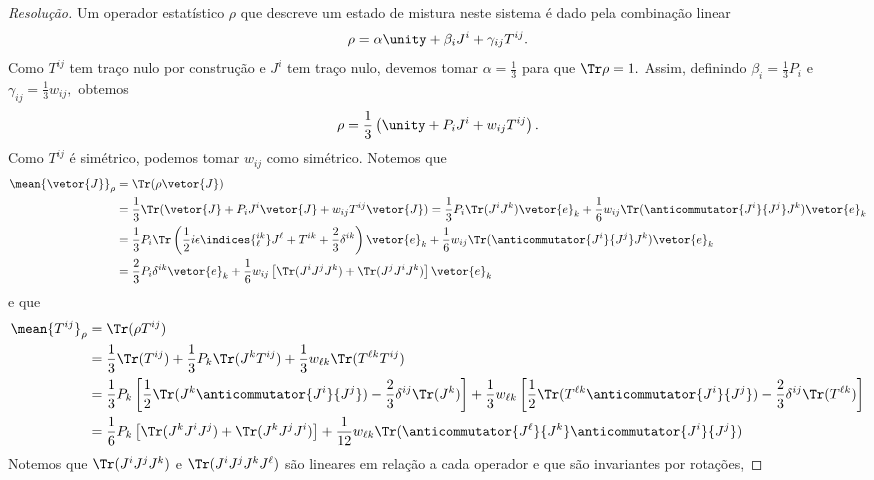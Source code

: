 \begin{proof}[Resolução]
    Um operador estatístico \(\rho\) que descreve um estado de mistura neste sistema é dado pela combinação linear
    \begin{equation*}
        \rho = \alpha\unity + \beta_i J^i + \gamma_{ij} T^{ij}.
    \end{equation*}
    Como \(T^{ij}\) tem traço nulo por construção e \(J^i\) tem traço nulo, devemos tomar \(\alpha = \frac13\) para que \(\Tr\rho = 1.\) Assim, definindo \(\beta_i = \frac13 P_i\) e \(\gamma_{ij} = \frac13 w_{ij},\) obtemos
    \begin{equation*}
        \rho = \frac13 \left(\unity + P_i J^i + w_{ij} T^{ij}\right).
    \end{equation*}
    Como \(T^{ij}\) é simétrico, podemos tomar \(w_{ij}\) como simétrico. Notemos que
    \begin{align*}
        \mean{\vetor{J}}_\rho &= \Tr( \rho \vetor{J})\\
                              &= \frac13 \Tr(\vetor{J} + P_i J^i \vetor{J} + w_{ij} T^{ij} \vetor{J}) = \frac13 P_i \Tr(J^i J^k) \vetor{e}_k + \frac16 w_{ij} \Tr(\anticommutator{J^i}{J^j}J^k) \vetor{e}_k\\
                              &= \frac13 P_i \Tr\left(\frac12i\epsilon\indices{^{ik}_\ell}J^\ell + T^{ik} + \frac23 \delta^{ik}\right)\vetor{e}_k + \frac16 w_{ij} \Tr(\anticommutator{J^i}{J^j}J^k)\vetor{e}_k\\
                              &= \frac23 P_i \delta^{ik} \vetor{e}_k + \frac16 w_{ij} \left[\Tr(J^i J^j J^k) + \Tr(J^j J^i J^k)\right] \vetor{e}_k
    \end{align*}
    e que
    \begin{align*}
        \mean{T^{ij}}_{\rho} &= \Tr(\rho T^{ij})\\
                             &= \frac13 \Tr(T^{ij}) + \frac13 P_k \Tr(J^k T^{ij}) + \frac13 w_{\ell k} \Tr(T^{\ell k} T^{ij})\\
                             &= \frac13 P_k \left[\frac12 \Tr(J^k \anticommutator{J^i}{J^j}) - \frac23 \delta^{ij} \Tr(J^k)\right] + \frac13 w_{\ell k} \left[\frac12\Tr(T^{\ell k} \anticommutator{J^i}{J^j}) - \frac23 \delta^{ij} \Tr(T^{\ell k})\right]\\
                             &= \frac16 P_k \left[\Tr(J^k J^i J^j) + \Tr(J^k J^j J^i)\right] + \frac1{12} w_{\ell k} \Tr(\anticommutator{J^\ell}{J^k} \anticommutator{J^i}{J^j})
    \end{align*}
    Notemos que \(\Tr(J^i J^j J^k)\) e \(\Tr(J^i J^j J^k J^\ell)\) são lineares em relação a cada operador e que são invariantes por rotações,

\end{proof}
